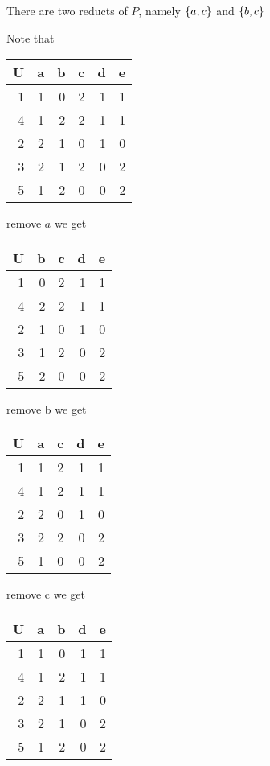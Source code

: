\documentclass[11pt]{article}
\begin{document}
There are two reducts of \(P\), namely \(\left\{ a,c\right\}\) and \(\left\{ b,c\right\}\)

Note that

\begin{center}
\begin{tabular}{rrrrrr}
U & a & b & c & d & e\\
\hline
1 & 1 & 0 & 2 & 1 & 1\\
4 & 1 & 2 & 2 & 1 & 1\\
\hline
2 & 2 & 1 & 0 & 1 & 0\\
\hline
3 & 2 & 1 & 2 & 0 & 2\\
5 & 1 & 2 & 0 & 0 & 2\\
\end{tabular}
\end{center}

remove \(a\) we get
\begin{center}
\begin{tabular}{rrrrr}
U & b & c & d & e\\
\hline
1 & 0 & 2 & 1 & 1\\
4 & 2 & 2 & 1 & 1\\
\hline
2 & 1 & 0 & 1 & 0\\
\hline
3 & 1 & 2 & 0 & 2\\
5 & 2 & 0 & 0 & 2\\
\end{tabular}
\end{center}
remove b we get
\begin{center}
\begin{tabular}{rrrrr}
U & a & c & d & e\\
\hline
1 & 1 & 2 & 1 & 1\\
4 & 1 & 2 & 1 & 1\\
\hline
2 & 2 & 0 & 1 & 0\\
\hline
3 & 2 & 2 & 0 & 2\\
5 & 1 & 0 & 0 & 2\\
\end{tabular}
\end{center}
remove c we get
\begin{center}
\begin{tabular}{rrrrr}
U & a & b & d & e\\
\hline
1 & 1 & 0 & 1 & 1\\
4 & 1 & 2 & 1 & 1\\
\hline
2 & 2 & 1 & 1 & 0\\
\hline
3 & 2 & 1 & 0 & 2\\
5 & 1 & 2 & 0 & 2\\
\end{tabular}
\end{center}
\end{document}
